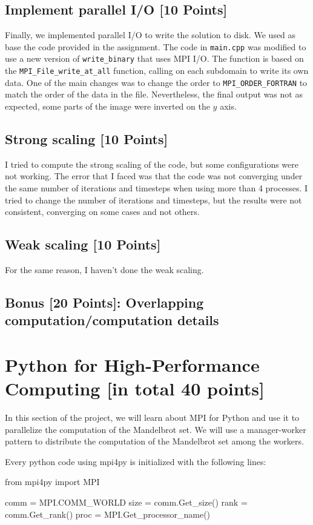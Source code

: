 \documentclass[unicode,11pt,a4paper,oneside,numbers=endperiod,openany]{scrartcl}
\begin{document}
\subsection{Implement parallel I/O [10 Points]}
Finally, we implemented parallel I/O to write the solution to disk. We used as
base the code provided in the assignment. The code in \texttt{main.cpp} was
modified to use a new version of \texttt{write\_binary} that uses MPI I/O. The
function is based on the \texttt{MPI\_File\_write\_at\_all} function, calling on
each subdomain to write its own data. One of the main changes was to change the
order to \texttt{MPI\_ORDER\_FORTRAN} to match the order of the data in the
file.
Nevertheless, the final output was not as expected, some parts of the image were
inverted on the $y$ axis. 

\subsection{Strong scaling [10 Points]}
I tried to compute the strong scaling of the code, but some configurations were
not working. The error that I faced was that the code was not converging under
the same number of iterations and timesteps when using more than 4 processes. 
I tried to change the number of iterations and timesteps, but the results were
not consistent, converging on some cases and not others.
\subsection{Weak scaling [10 Points]}
For the same reason, I haven't done the weak scaling.
\subsection{Bonus [20 Points]: Overlapping computation/computation details}


\section{Python for High-Performance Computing [in total 40 points]}
In this section of the project, we will learn about MPI for Python and use it
to parallelize the computation of the Mandelbrot set. We will use a
manager-worker
pattern to distribute the computation of the Mandelbrot set among the workers.

Every python code using mpi4py is initialized with the following lines:
\begin{pythonverbatim}
from mpi4py import MPI

comm = MPI.COMM_WORLD
size = comm.Get_size()
rank = comm.Get_rank()
proc = MPI.Get_processor_name()
\end{pythonverbatim}
\end{document}
